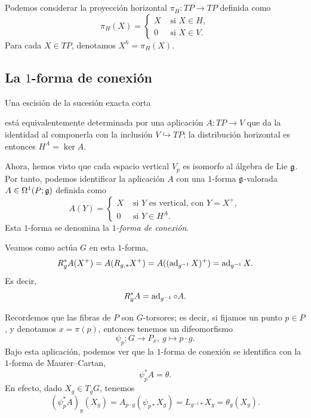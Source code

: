 \documentclass[11pt,a4paper]{amsbook}
\theoremstyle{remark} \newtheorem{rmk}[subsection]{Observación}
\theoremstyle{definition} \newtheorem{defn}[subsection]{Definición}
\theoremstyle{definition} \newtheorem{ex}[subsection]{Ejemplo}
\theoremstyle{definition} \newtheorem{ej}[subsection]{Ejercicio}
\begin{document}
\subsection{} Podemos considerar la proyección horizontal $\pi_H: TP \rightarrow TP$ definida como
\begin{equation*}
  \pi_H(X) =
  \begin{cases}
X & \text{ si } X \in H, \\
0 & \text{ si } X \in V.
\end{cases}
\end{equation*}
Para cada $X\in TP$, denotamos $X^h=\pi_H(X)$.

\subsection{La $1$-forma de conexión} Una escisión de la sucesión exacta corta
  \begin{center}
  \end{center}
  está equivalentemente determinada por una aplicación $A:TP\rightarrow V$ que da la identidad al componerla con la inclusión $V\hookrightarrow TP$; la distribución horizontal es entonces $H^A=\ker A$.

  Ahora, hemos visto que cada espacio vertical $V_p$ es isomorfo al álgebra de Lie $\mathfrak{g}$. Por tanto, podemos identificar la aplicación $A$ con una $1$-forma $\mathfrak{g}$-valorada $A\in \Omega^1(P;\mathfrak{g})$ definida como
  \begin{equation*}
    A(Y) =
    \begin{cases}
X & \text{ si } Y \text{ es vertical, con } Y=X^+,\\
0 & \text{ si } Y\in H^A .
\end{cases}
  \end{equation*}
Esta $1$-forma se denomina la \emph{$1$-forma de conexión}.

Veamos como actúa $G$ en esta $1$-forma,
\begin{equation*}
R^*_g A (X^+) = A(R_{g,*}X^+) = A((\operatorname{ad}_{g^{-1}}X)^+) = \operatorname{ad}_{g^{-1}}X.
\end{equation*}
Es decir,
\begin{equation*}
R^*_g A = \operatorname{ad}_{g^{-1}} \circ A.
\end{equation*}

Recordemos que las fibras de $P$ son $G$-torsores; es decir, si fijamos un punto $p\in P$, y denotamos $x=\pi(p)$, entonces tenemos un difeomorfismo
\begin{equation*}
\psi_p:G \rightarrow P_x,\ g \mapsto p \cdot g.
\end{equation*}
Bajo esta aplicación, podemos ver que la $1$-forma de conexión se identifica con la $1$-forma de Maurer--Cartan,
\begin{equation*}
\psi_p^* A = \theta.
\end{equation*}
En efecto, dado $X_g \in T_g G$, tenemos
\begin{equation*}
(\psi_p^* A)_g (X_g) = A_{p\cdot g}(\psi_{p*} X_g) = L_{g^{-1} *} X_g = \theta_g(X_g).
\end{equation*}
\end{document}
